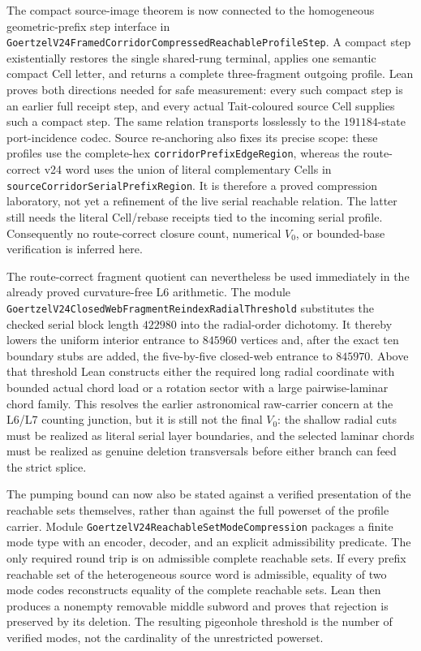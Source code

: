 \documentclass[11pt]{article}
\theoremstyle{definition}
\begin{document}
The compact source-image theorem is now connected to the homogeneous
geometric-prefix step interface in
\texttt{GoertzelV24FramedCorridorCompressedReachableProfileStep}.  A compact
step existentially restores the single shared-rung terminal, applies one
semantic compact Cell letter, and returns a complete three-fragment outgoing
profile.  Lean proves both directions needed for safe measurement: every such
compact step is an earlier full receipt step, and every actual Tait-coloured
source Cell supplies such a compact step.  The same relation transports
losslessly to the $191184$-state port-incidence codec.  Source re-anchoring
also fixes its precise scope: these profiles use the complete-hex
\texttt{corridorPrefixEdgeRegion}, whereas the route-correct v24 word uses the
union of literal complementary Cells in
\texttt{sourceCorridorSerialPrefixRegion}.  It is therefore a proved
compression laboratory, not yet a refinement of the live serial reachable
relation.  The latter still needs the literal Cell/rebase receipts tied to the
incoming serial profile.  Consequently no route-correct closure count,
numerical $V_0$, or bounded-base verification is inferred here.

The route-correct fragment quotient can nevertheless be used immediately in
the already proved curvature-free L6 arithmetic.  The module
\texttt{GoertzelV24ClosedWebFragmentReindexRadialThreshold} substitutes the
checked serial block length $422980$ into the radial-order dichotomy.  It
thereby lowers the uniform interior entrance to $845960$ vertices and, after
the exact ten boundary stubs are added, the five-by-five closed-web entrance
to $845970$.  Above that threshold Lean constructs either the required long
radial coordinate with bounded actual chord load or a rotation sector with a
large pairwise-laminar chord family.  This resolves the earlier astronomical
raw-carrier concern at the L6/L7 counting junction, but it is still not the
final $V_0$: the shallow radial cuts must be realized as literal serial layer
boundaries, and the selected laminar chords must be realized as genuine
deletion transversals before either branch can feed the strict splice.

The pumping bound can now also be stated against a verified presentation of
the reachable sets themselves, rather than against the full powerset of the
profile carrier.  Module
\texttt{GoertzelV24ReachableSetModeCompression} packages a finite mode type
with an encoder, decoder, and an explicit admissibility predicate.  The only
required round trip is on admissible complete reachable sets.  If every prefix
reachable set of the heterogeneous source word is admissible, equality of two
mode codes reconstructs equality of the complete reachable sets.  Lean then
produces a nonempty removable middle subword and proves that rejection is
preserved by its deletion.  The resulting pigeonhole threshold is the number
of verified modes, not the cardinality of the unrestricted powerset.
\end{document}

